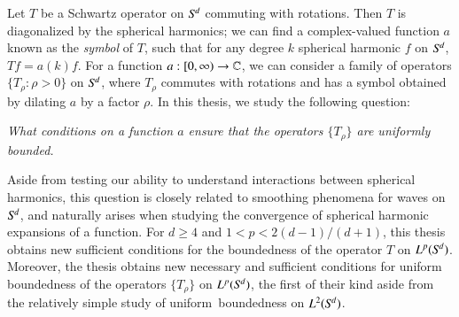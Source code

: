 
\vspace{-1em}
Let $T$ be a Schwartz operator on ${S}^{\!{d}}$ commuting with rotations. Then $T$ is diagonalized by the spherical harmonics; we can find a complex-valued function $a$ known as the \emph{symbol} of $T$, such that for any degree $k$ spherical harmonic $f$ on ${S}^{\!{d}}$, $Tf = a(k) f$. For a function $a: [0,\infty) \to \operatorname{\mathbb{C}}$, we can consider a family of operators $\{ T_{\!\rho} : \rho > 0 \}$ on ${S}^{\!{d}}$, where $T_{\!\rho}$ commutes with rotations and has a symbol obtained by dilating $a$ by a factor $\rho$. In this thesis, we study the following question:  
%
\begin{changemargin}{3cm}{3cm}
\begin{center}
  \emph{What conditions on a function $a$ ensure that the operators $\{ T_{\!\rho} \}$ are uniformly bounded.}
\end{center}
\end{changemargin}
%
Aside from testing our ability to understand interactions between spherical harmonics, this question is closely related to smoothing phenomena for waves on ${S}^{\!{d}}$, and naturally arises when studying the convergence of spherical harmonic expansions of a function. For $d \geq 4$ and $1 < p < 2(d-1)/(d+1)$, this thesis obtains new sufficient conditions for the boundedness of the operator $T$ on $L^p({S}^{\!{d}})$. Moreover, the thesis obtains new necessary and sufficient conditions for uniform boundedness of the operators $\{ T_{\!\rho} \}$ on $L^p({S}^{\!{d}})$, the first of their kind aside from the relatively simple study of uniform\ boundedness on $L^2({S}^{\!{d}})$.


%


